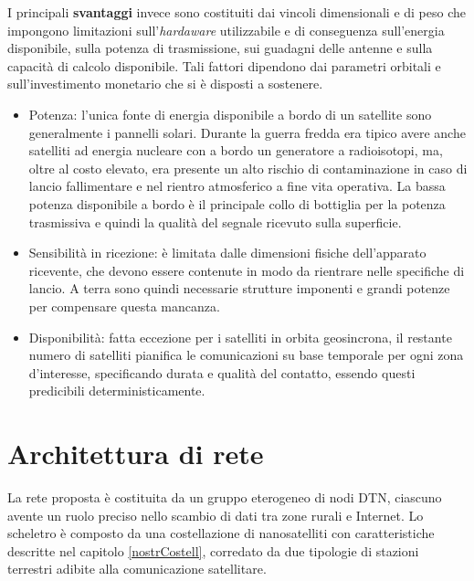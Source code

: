 \documentclass[12pt,a4paper,oneside]{book}
\begin{document}
			I principali {\bf svantaggi} invece sono costituiti dai vincoli dimensionali e di peso che impongono limitazioni sull'\textit{hardaware} utilizzabile e di conseguenza sull'energia disponibile, sulla potenza di trasmissione, sui guadagni delle antenne e sulla capacità di calcolo disponibile. Tali fattori dipendono dai parametri orbitali e sull'investimento monetario che si è disposti a sostenere. 
			\begin{itemize}
				\item Potenza: l'unica fonte di energia disponibile a bordo di un satellite sono generalmente i pannelli solari. Durante la guerra fredda era tipico avere anche satelliti ad energia nucleare con a bordo un generatore a radioisotopi, ma, oltre al costo elevato, era presente un alto rischio di contaminazione in caso di lancio fallimentare e nel rientro atmosferico a fine vita operativa.
				La bassa potenza disponibile a bordo è il principale collo di bottiglia per la potenza trasmissiva e quindi la qualità del segnale ricevuto sulla superficie. 
				\item Sensibilità in ricezione: è limitata dalle dimensioni fisiche dell'apparato ricevente, che devono essere contenute in modo da rientrare nelle specifiche di lancio. A terra sono quindi necessarie strutture imponenti e grandi potenze per compensare questa mancanza. 
				\item Disponibilità: fatta eccezione per i satelliti in orbita geosincrona, il restante numero di satelliti pianifica le comunicazioni su base temporale per ogni zona d'interesse, specificando durata e qualità del contatto, essendo questi predicibili deterministicamente.			
			\end{itemize}
			
			
		
		\section{Architettura di rete}	
		
		La rete proposta è costituita da un gruppo eterogeneo di nodi DTN, ciascuno avente un ruolo preciso nello scambio di dati tra zone rurali e Internet. Lo scheletro è composto da una costellazione di nanosatelliti con caratteristiche descritte nel capitolo \ref{nostrCostell}, corredato da due tipologie di stazioni terrestri adibite alla comunicazione satellitare. 
		
\end{document}
